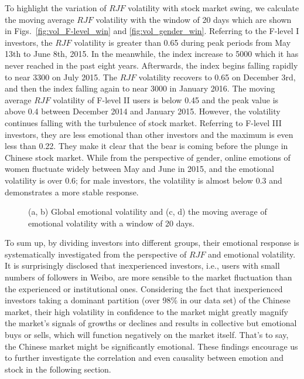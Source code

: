 \documentclass[aps,preprint,groupedaddress]{revtex4-1}
\begin{document}
To highlight the variation of $RJF$ volatility with stock market swing, we calculate the moving average $RJF$ volatility with the window of 20 days which are shown in Figs.~\ref{fig:vol_F-level_win} and \ref{fig:vol_gender_win}. Referring to the F-level I investors, the $RJF$ volatility is greater than 0.65 during peak periods from May 13th to June 8th, 2015. In the meanwhile, the index increase to 5000 which it has never reached in the past eight years. Afterwards, the index begins falling rapidly to near 3300 on July 2015. The $RJF$ volatility recovers to 0.65 on December 3rd, and then the index falling again to near 3000 in January 2016. The moving average $RJF$ volatility of F-level II users is below 0.45 and the peak value is above 0.4 between December 2014 and January 2015. However, the volatility continues falling with the turbulence of stock market. Referring to F-level III investors, they are less emotional than other investors and the maximum is even less than 0.22. They make it clear that the bear is coming before the plunge in Chinese stock market. While from the perspective of gender, online emotions of women fluctuate widely between May and June in 2015, and the emotional volatility is over 0.6; for male investors, the volatility is almost below 0.3 and demonstrates a more stable response.

\begin{figure}
\centering
\hfil
{}
\hfil
\hfil
{}
\caption{(a, b) Global emotional volatility and (c, d) the moving average of emotional volatility with a window of 20 days.}
\label{fig:vol}
\end{figure}

To sum up, by dividing investors into different groups, their emotional response is systematically investigated from the perspective of $RJF$ and emotional volatility. It is surprisingly disclosed that inexperienced investors, i.e., users with small numbers of followers in Weibo, are more sensible to the market fluctuation than the experienced or institutional ones. Considering the fact that inexperienced investors taking a dominant partition (over 98\% in our data set) of the Chinese market, their high volatility in confidence to the market might greatly magnify the market's signals of growths or declines and results in collective but emotional buys or sells, which will function negatively on the market itself. That's to say, the Chinese market might be significantly emotional. These findings encourage us to further investigate the correlation and even causality between emotion and stock in the following section. 
\end{document}
